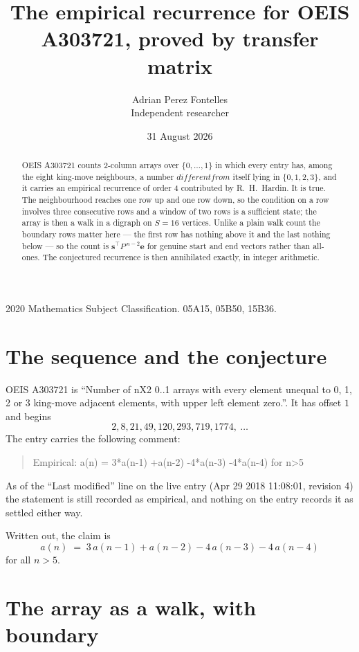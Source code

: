 \documentclass[11pt,a4paper]{article}
\title{The empirical recurrence for OEIS A303721, proved by transfer matrix}
\author{Adrian Perez Fontelles\\ \small Independent researcher}
\date{31 August 2026}
\theoremstyle{plain}
\theoremstyle{definition}
\begin{document}
\maketitle

\begin{abstract}
OEIS A303721 counts $2$-column arrays over $\{0,\dots,1\}$ in which every entry has,
among the eight king-move neighbours, a number $different from$ itself lying in $\{0,1,2,3\}$, and it carries an empirical
recurrence of order $4$ contributed by R.~H.~Hardin. It is true. The neighbourhood
reaches one row up and one row down, so the condition on a row involves three consecutive
rows and a window of two rows is a sufficient state; the array is then a walk in a digraph
on $S=16$ vertices. Unlike a plain walk count the boundary rows matter here --- the first
row has nothing above it and the last nothing below --- so the count is
$\mathbf{s}^{\!\top}P^{\,n-2}\mathbf{e}$ for genuine start and end vectors rather than
all-ones. The conjectured recurrence is then annihilated exactly, in integer arithmetic.
\end{abstract}

\noindent\small 2020 Mathematics Subject Classification. 05A15, 05B50, 15B36.\normalsize

\section{The sequence and the conjecture}

OEIS A303721 is ``Number of nX2 0..1 arrays with every element unequal to 0, 1, 2 or 3 king-move adjacent elements, with upper left element zero.''. It has offset
$1$ and begins
\[
2, 8, 21, 49, 120, 293, 719, 1774,\ \dots
\]
The entry carries the following comment:
\begin{quote}\small
Empirical: a(n) = 3*a(n-1) +a(n-2) -4*a(n-3) -4*a(n-4) for n>5
\end{quote}
As of the ``Last modified'' line on the live entry (Apr 29 2018 11:08:01, revision
4) the statement is still recorded as empirical, and nothing on the entry
records it as settled either way.

Written out, the claim is
\begin{equation}\label{eq:conj}
a(n)\;=\;3\,a(n-1) + a(n-2) - 4\,a(n-3) - 4\,a(n-4)
\end{equation}
for all $n>5$.

\section{The array as a walk, with boundary}
\end{document}
